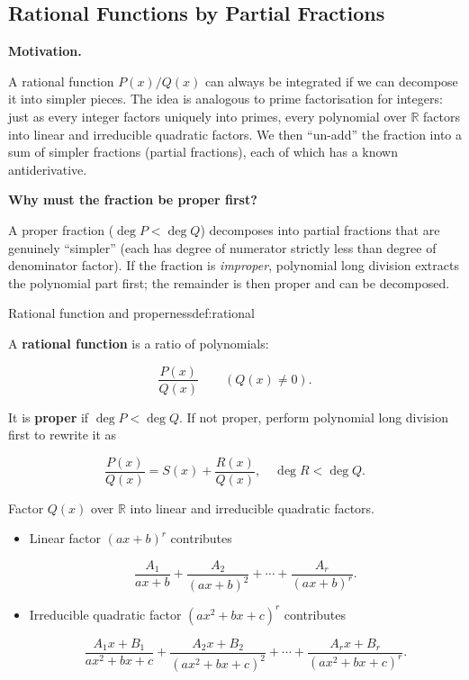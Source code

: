 \subsection{Rational Functions by Partial Fractions}

\textbf{Motivation.}

A rational function $P(x)/Q(x)$ can always be integrated if we can decompose it into simpler pieces. The idea is analogous to prime factorisation for integers: just as every integer factors uniquely into primes, every polynomial over $\mathbb{R}$ factors into linear and irreducible quadratic factors. We then ``un-add'' the fraction into a sum of simpler fractions (partial fractions), each of which has a known antiderivative.

\textbf{Why must the fraction be proper first?}

A proper fraction ($\deg P < \deg Q$) decomposes into partial fractions that are genuinely ``simpler'' (each has degree of numerator strictly less than degree of denominator factor). If the fraction is \emph{improper}, polynomial long division extracts the polynomial part first; the remainder is then proper and can be decomposed.

\begin{definition}{Rational function and properness}{def:rational}

A \textbf{rational function} is a ratio of polynomials:

\[
\frac{P(x)}{Q(x)}\qquad (Q(x)\neq 0).
\]

It is \textbf{proper} if $\deg P<\deg Q$. If not proper, perform polynomial long division first to rewrite it as

\[
\frac{P(x)}{Q(x)} = S(x) + \frac{R(x)}{Q(x)},
\quad \deg R<\deg Q.
\]

\end{definition}

\begin{keyformula}[title={Key Formula: Partial fraction templates}]

Factor $Q(x)$ over $\mathbb{R}$ into linear and irreducible quadratic factors.

\begin{itemize}
\item Linear factor $(ax+b)^r$ contributes

\[
\frac{A_1}{ax+b}+\frac{A_2}{(ax+b)^2}+\cdots+\frac{A_r}{(ax+b)^r}.
\]

\item Irreducible quadratic factor $(ax^2+bx+c)^r$ contributes

\[
\frac{A_1x+B_1}{ax^2+bx+c}+\frac{A_2x+B_2}{(ax^2+bx+c)^2}+\cdots+\frac{A_rx+B_r}{(ax^2+bx+c)^r}.
\]

\end{itemize}

\end{keyformula}

